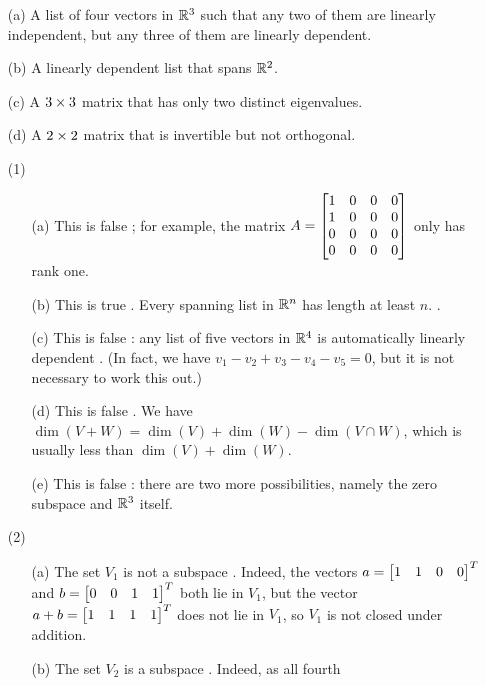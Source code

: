 \documentclass[a4paper]{article}
\begin{document}
\begin{problem}[2011-12 resit]
\begin{itemize}
   \begin{itemize}
    \item[(a)] A list of four vectors in ${\mathbb{R}}^3$ such that any two of
     them are linearly independent, but any three of them are linearly
     dependent. 
    \item[(b)] A linearly dependent list that spans ${\mathbb{R}}^2$.
    \item[(c)] A $3\times 3$ matrix that has only two distinct
     eigenvalues. 
    \item[(d)] A $2\times 2$ matrix that is invertible but not orthogonal.
   \end{itemize}
 \end{itemize}
\end{problem}
\begin{solution}
 \begin{itemize}
  \item[(1)]
   \begin{itemize}
    \item[(a)] This is false \mk; for example, the matrix
     $A=\left[\begin{matrix} 1&0&0&0\\ 1&0&0&0 \\ 0&0&0&0 \\ 0&0&0&0\end{matrix}\right]$ only has
     rank one. \mk
    \item[(b)] This is true \mk.  Every spanning list in ${\mathbb{R}}^n$ has
     length at least $n$. \mk.
    \item[(c)] This is false \mk: any list of five vectors in ${\mathbb{R}}^4$ is
     automatically linearly dependent \mk.  (In fact, we have
     $v_1-v_2+v_3-v_4-v_5=0$, but it is not necessary to work this out.) 
    \item[(d)] This is false \mk.  We have
     $\dim(V+W)=\dim(V)+\dim(W)-\dim(V\cap W)$, which is usually less
     than $\dim(V)+\dim(W)$. \mk
    \item[(e)] This is false \mk: there are two more possibilities,
     namely the zero subspace and ${\mathbb{R}}^3$ itself. \mk
   \end{itemize}
  \item[(2)]
   \begin{itemize}
    \item[(a)] The set $V_1$ is not a subspace \mk.  Indeed, the vectors
     $a=\left[\begin{matrix} 1&1&0&0\end{matrix}\right]^T$ and $b=\left[\begin{matrix} 0&0&1&1\end{matrix}\right]^T$ both lie in
     $V_1$, but the vector $a+b=\left[\begin{matrix} 1&1&1&1\end{matrix}\right]^T$ does not lie in
     $V_1$, so $V_1$ is not closed under addition. \mk
    \item[(b)] The set $V_2$ is a subspace \mk.  Indeed, as all fourth

\end{itemize}
\end{itemize}
\end{solution}
\end{document}
